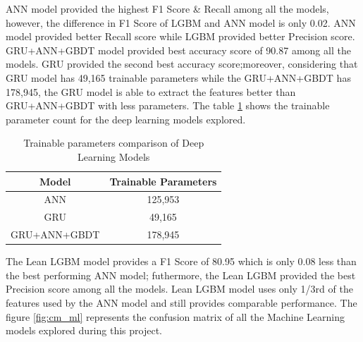 \documentclass[twoside,11pt,a4paper]{article}
\begin{document}
\acs{ANN} model provided the highest F1 Score \& Recall among all the models, however, the difference in F1 Score of \acs{LGBM} and \acs{ANN} model is only 0.02. \acs{ANN}  model provided better Recall score while \acs{LGBM} provided better Precision score. \acs{GRU}+\acs{ANN}+\acs{GBDT} model provided best accuracy score of 90.87 among all the models. \acs{GRU} provided the second best accuracy score;moreover, considering that \acs{GRU} model has 49,165 trainable parameters while the \acs{GRU}+\acs{ANN}+\acs{GBDT} has 178,945, the \acs{GRU} model is able to extract the features better than \acs{GRU}+\acs{ANN}+\acs{GBDT} with less parameters. The table \ref{table:trainable_params} shows the trainable parameter count for the deep learning models explored.

\begin{table}[h]
	\begin{center}
		\begin{tabular}{|| c | c ||} 
			\hline
			Model & Trainable Parameters \\ [0.5ex] 
			\hline\hline
			ANN	& 125,953 \\
			\hline
			GRU	& 49,165 \\
			\hline
			GRU+ANN+GBDT	& 178,945 \\
			\hline
		\end{tabular}
		\caption{Trainable parameters comparison of Deep Learning Models}
		\label{table:trainable_params}
	\end{center}
\end{table}

The Lean \acs{LGBM} model provides a F1 Score of 80.95 which is only 0.08 less than the best performing \acs{ANN} model; futhermore, the Lean \acs{LGBM} provided the best Precision score among all the models. Lean \acs{LGBM} model uses only 1/3rd of the features used by the \acs{ANN} model and still provides comparable performance. The figure \ref{fig:cm_ml} represents the confusion matrix of all the Machine Learning models explored during this project.
\end{document}
